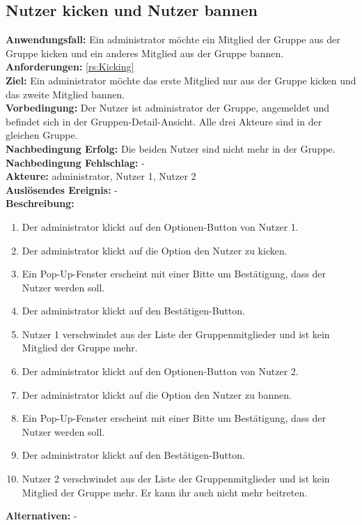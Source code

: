 \documentclass[parskip=full]{scrartcl}
\begin{document}
\subsection{Nutzer kicken und Nutzer bannen}
\textbf{Anwendungsfall:} Ein \gls{administrator} möchte ein Mitglied der Gruppe aus der Gruppe \gls{kicken} und ein anderes Mitglied aus der Gruppe \gls{bannen}.\\
\textbf{Anforderungen:} \ref{rs:Kicking}\\
\textbf{Ziel:} Ein \gls{administrator} möchte das erste Mitglied nur aus der Gruppe \gls{kicken} und das zweite Mitglied \gls{bannen}.\\
\textbf{Vorbedingung:} Der Nutzer ist \gls{administrator} der Gruppe, angemeldet und befindet sich in der Gruppen-Detail-Ansicht. Alle drei Akteure sind in der gleichen Gruppe.\\
\textbf{Nachbedingung Erfolg:} Die beiden Nutzer sind nicht mehr in der Gruppe.\\
\textbf{Nachbedingung Fehlschlag:} -\\
\textbf{Akteure:} \gls{administrator}, Nutzer 1, Nutzer 2\\
\textbf{Auslösendes Ereignis:} -\\
\textbf{Beschreibung:}
\begin{enumerate}
    \item Der \gls{administrator} klickt auf den Optionen-Button von Nutzer 1.
    \item Der \gls{administrator} klickt auf die Option den Nutzer zu \gls{kicken}.
    \item Ein Pop-Up-Fenster erscheint mit einer Bitte um Bestätigung, dass der Nutzer  werden soll.
    \item Der \gls{administrator} klickt auf den Bestätigen-Button.
    \item Nutzer 1 verschwindet aus der Liste der Gruppenmitglieder und ist kein Mitglied der Gruppe mehr.
    \item Der \gls{administrator} klickt auf den Optionen-Button von Nutzer 2.
    \item Der \gls{administrator} klickt auf die Option den Nutzer zu \gls{bannen}.
    \item Ein Pop-Up-Fenster erscheint mit einer Bitte um Bestätigung, dass der Nutzer  werden soll.
    \item Der \gls{administrator} klickt auf den Bestätigen-Button.
    \item Nutzer 2 verschwindet aus der Liste der Gruppenmitglieder und ist kein Mitglied der Gruppe mehr. Er kann ihr auch nicht mehr beitreten.
\end{enumerate}
\textbf{Alternativen:} -
\newpage
\end{document}
